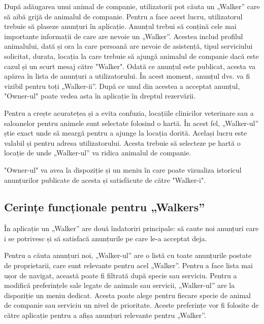 După adăugarea unui animal de companie, utilizatorii pot căuta un „Walker” care să aibă grijă de animalul de companie. Pentru a face acest lucru, utilizatorul trebuie să plaseze anunțuri în aplicație. Anunțul trebui să conțină cele mai importante informații de care are nevoie un „Walker”. Acestea includ profilul animalului, dată și ora la care persoană are nevoie de asistență, tipul serviciului solicitat, durata, locația la care trebuie să ajungă animalul de companie dacă este cazul și un scurt mesaj către "Walker". Odată ce anunțul este publicat, acesta va apărea în lista de anunțuri a utilizatorului. În acest moment, anunțul dvs. va fi vizibil pentru toți „Walker-ii”. După ce unul din acestea a acceptat anunțul, "Owner-ul" poate vedea asta în aplicație în dreptul rezervării.

Pentru a crește acuratețea și a evita confuzia, locațiile clinicilor veterinare sau a saloanelor pentru animele sunt selectate folosind o hartă. În acest fel, „Walker-ul” știe exact unde să meargă pentru a ajunge la locația dorită. Același lucru este valabil și pentru adresa utilizatorului. Acesta trebuie să selecteze pe hartă o locație de unde „Walker-ul” va ridica animalul de companie.

"Owner-ul" va avea la dispoziție și un meniu în care poate vizualiza istoricul anunțurilor publicate de acesta și satisfăcute de către "Walker-i".


\subsection{Cerințe funcționale pentru „Walkers”}


În aplicație un „Walker” are două îndatoriri principale: să caute noi anunțuri care i se potrivesc și să satisfacă anunțurile pe care le-a acceptat deja.

Pentru a căuta anunțuri noi, „Walker-ul” are o listă cu toate anunțurile postate de proprietarii, care sunt relevante pentru acel „Walker”. Pentru a face lista mai ușor de navigat, această poate fi filtrată după specie sau serviciu. Pentru a modifică preferințele sale legate de animale sau servicii, „Walker-ul” are la dispoziție un meniu dedicat. Acesta poate alege pentru fiecare specie de animal de companie sau serviciu un nivel de prioritate. Aceste preferințe vor fi folosite de către aplicație pentru a afișa anunțuri relevante pentru „Walker”.

